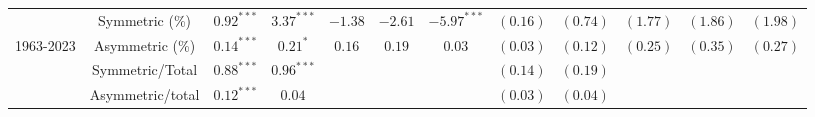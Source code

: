 \documentclass[
]{article}
\begin{document}
\begin{tabular}{lccccccccccc}
   & Symmetric (\%) & $0.92^{***}$ & $3.37^{***}$ & $-1.38$ & $-2.61$ & $-5.97^{***}$ & $(0.16)$ & $(0.74)$ & $(1.77)$ & $(1.86)$ & $(1.98)$ \\ 
   \vspace{5pt}1963-2023 & Asymmetric (\%) & $0.14^{***}$ & $0.21^{*}$ & $0.16$ & $0.19$ & $0.03$ & $(0.03)$ & $(0.12)$ & $(0.25)$ & $(0.35)$ & $(0.27)$ \\ 
   & Symmetric/Total & $0.88^{***}$ & $0.96^{***}$ &  &  &  & $(0.14)$ & $(0.19)$ &  &  &  \\ 
   & Asymmetric/total & $0.12^{***}$ & $0.04$ &  &  &  & $(0.03)$ & $(0.04)$ &  &  &  \\ 
   \bottomrule 
\end{tabular}
\end{document}
